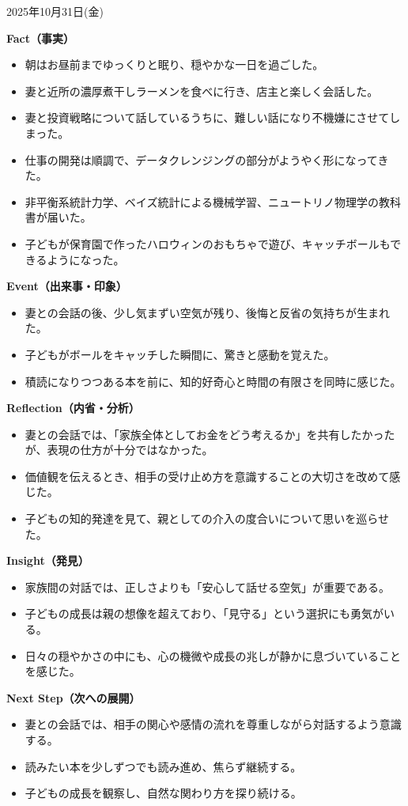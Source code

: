 \documentclass[dvipdfmx, autodetect-engine, aspectratio=169, 10.5pt]{beamer}
\begin{document}
\begin{frame}{2025年10月31日(金)}  
	\tiny  

	\textbf{Fact（事実）}  
	\begin{itemize}
		\item 朝はお昼前までゆっくりと眠り、穏やかな一日を過ごした。  
		\item 妻と近所の濃厚煮干しラーメンを食べに行き、店主と楽しく会話した。  
		\item 妻と投資戦略について話しているうちに、難しい話になり不機嫌にさせてしまった。  
		\item 仕事の開発は順調で、データクレンジングの部分がようやく形になってきた。  
		\item 非平衡系統計力学、ベイズ統計による機械学習、ニュートリノ物理学の教科書が届いた。  
		\item 子どもが保育園で作ったハロウィンのおもちゃで遊び、キャッチボールもできるようになった。  
	\end{itemize}

	\textbf{Event（出来事・印象）}  
	\begin{itemize}
		\item 妻との会話の後、少し気まずい空気が残り、後悔と反省の気持ちが生まれた。  
		\item 子どもがボールをキャッチした瞬間に、驚きと感動を覚えた。  
		\item 積読になりつつある本を前に、知的好奇心と時間の有限さを同時に感じた。  
	\end{itemize}

	\textbf{Reflection（内省・分析）}  
	\begin{itemize}
		\item 妻との会話では、「家族全体としてお金をどう考えるか」を共有したかったが、表現の仕方が十分ではなかった。  
		\item 価値観を伝えるとき、相手の受け止め方を意識することの大切さを改めて感じた。  
		\item 子どもの知的発達を見て、親としての介入の度合いについて思いを巡らせた。  
	\end{itemize}

	\textbf{Insight（発見）}  
	\begin{itemize}
		\item 家族間の対話では、正しさよりも「安心して話せる空気」が重要である。  
		\item 子どもの成長は親の想像を超えており、「見守る」という選択にも勇気がいる。  
		\item 日々の穏やかさの中にも、心の機微や成長の兆しが静かに息づいていることを感じた。  
	\end{itemize}

	\textbf{Next Step（次への展開）}  
	\begin{itemize}
		\item 妻との会話では、相手の関心や感情の流れを尊重しながら対話するよう意識する。  
		\item 読みたい本を少しずつでも読み進め、焦らず継続する。  
		\item 子どもの成長を観察し、自然な関わり方を探り続ける。  
	\end{itemize}
\end{frame}
\end{document}
